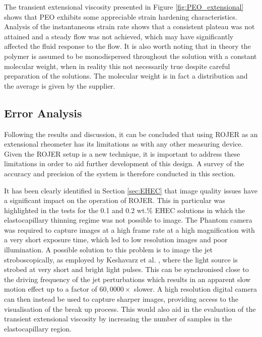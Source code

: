 \documentclass[11pt]{article}
\begin{document}
The transient extensional viscosity presented in Figure \ref{fig:PEO_extensional} shows that PEO exhibits some appreciable strain hardening characteristics. Analysis of the instantaneous strain rate shows that a consistent plateau was not attained and a steady flow was not achieved, which may have significantly affected the fluid response to the flow. It is also worth noting that in theory the polymer is assumed to be monodispersed throughout the solution with a constant molecular weight, when in reality this not necessarily true despite careful preparation of the solutions. The molecular weight is in fact a distribution and the average is given by the supplier.

\subsection{Error Analysis} \label{sec:error}
Following the results and discussion, it can be concluded that using ROJER as an extensional rheometer has its limitations as with any other measuring device. Given the ROJER setup is a new technique, it is important to address these limitations in order to aid further development of this design. A survey of the accuracy and precision of the system is therefore conducted in this section.

It has been clearly identified in Section \ref{sec:EHEC} that image quality issues have a significant impact on the operation of ROJER. This in particular was highlighted in the tests for the 0.1 and 0.2 wt.\% EHEC solutions in which the elastocapillary thinning regime was not possible to image. The Phantom camera was required to capture images at a high frame rate at a high magnification with a very short exposure time, which led to low resolution images and poor illumination. A possible solution to this problem is to image the jet stroboscopically, as employed by Keshavarz et al. \cite{keshavarz2015studying}, where the light source is strobed at very short and bright light pulses. This can be synchronised close to the driving frequency of the jet perturbations which results in an apparent slow motion effect up to a factor of $60,0000 \times$ slower. A high resolution digital camera can then instead be used to capture sharper images, providing access to the visualisation of the break up process. This would also aid in the evaluation of the transient extensional viscosity by increasing the number of samples in the elastocapillary region.
\end{document}

